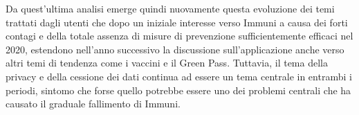Da quest'ultima analisi emerge quindi nuovamente questa evoluzione dei temi trattati dagli utenti che dopo un iniziale interesse verso Immuni a causa dei forti contagi e della totale assenza di misure di prevenzione sufficientemente efficaci nel 2020, estendono nell'anno successivo la discussione sull'applicazione anche verso altri temi di tendenza come i vaccini e il Green Pass.
Tuttavia, il tema della privacy e della cessione dei dati continua ad essere un tema centrale in entrambi i periodi, sintomo che forse quello potrebbe essere uno dei problemi centrali che ha causato il graduale fallimento di Immuni.

